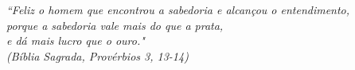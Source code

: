 \documentclass[
	12pt,				%
	oneside,
	a4paper,			%
	chapter=TITLE,
	english,			%
	brazil,				%
	]{abntex2}
\begin{document}

\frenchspacing 

\pretextual

\imprimircapa

\imprimirfolhaderosto






\begin{epigrafe}
	\vspace*{\fill}
	\begin{flushright}
		\textit{``Feliz o homem que encontrou a sabedoria e alcançou o entendimento,\\
			porque a sabedoria vale mais do que a prata, \\
			e dá mais lucro que o ouro."\\
			(Bíblia Sagrada, Provérbios 3, 13-14)}
	\end{flushright}
\end{epigrafe}



\listoffigures*
\cleardoublepage

\listoftables*
\cleardoublepage

\end{document}
